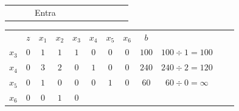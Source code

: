 \begin{frame}
{\begin{table}
\begin{tabular}{c c c c c c c c c c c c}
				& & & \scriptsize Entra \\
			\end{tabular}
		\end{table}	
	}	
	{
		\begin{table}
			\begin{tabular}{c c c c c c c c c c c c}
				& \cellcolor{blue!80} \color{white} $ \scriptstyle z$
				& \cellcolor{blue!80} \color{white} $ \scriptstyle x_1$ 
				& \cellcolor{blue!80} \color{white} $ \scriptstyle x_2$
				& \cellcolor{blue!80} \color{red} $ \scriptstyle x_3$
				& \cellcolor{blue!80} \color{red} $ \scriptstyle x_4$
				& \cellcolor{blue!80} \color{red} $ \scriptstyle x_5$
				& \cellcolor{blue!80} \color{red} $ \scriptstyle x_6$ 
				& \cellcolor{blue!80} \color{white} $ \scriptstyle b$ \\
				\cellcolor{blue!80} \color{red} $ \scriptstyle x_3$
				& \cellcolor{yellow!60}  $ \scriptstyle 0$
				& \cellcolor{yellow!60}  $ \scriptstyle 1$ 
				& \cellcolor{gray!60}  $ \scriptstyle 1$
				& \cellcolor{yellow!60}  $ \scriptstyle 1$
				& \cellcolor{yellow!60}  $ \scriptstyle 0$
				& \cellcolor{yellow!60}  $ \scriptstyle 0$
				& \cellcolor{yellow!60}  $ \scriptstyle 0$ 
				& \cellcolor{gray!60}  $ \scriptstyle 100$
				& $ \scriptstyle 100 \div 1 = 100$ \\ 
				\cellcolor{blue!80} \color{red} $ \scriptstyle x_4$
				& \cellcolor{yellow!60}  $ \scriptstyle 0$
				& \cellcolor{yellow!60}  $ \scriptstyle 3$ 
				& \cellcolor{gray!60}  $ \scriptstyle 2$
				& \cellcolor{yellow!60}  $ \scriptstyle 0$
				& \cellcolor{yellow!60}  $ \scriptstyle 1$
				& \cellcolor{yellow!60}  $ \scriptstyle 0$
				& \cellcolor{yellow!60}  $ \scriptstyle 0$ 
				& \cellcolor{gray!60}  $ \scriptstyle 240$ 
				& $ \scriptstyle 240 \div 2 = 120$ \\ 
				\cellcolor{blue!80} \color{red} $ \scriptstyle x_5$  
				& \cellcolor{yellow!60}  $ \scriptstyle 0$
				& \cellcolor{yellow!60}  $ \scriptstyle 1$ 
				& \cellcolor{gray!60}  $ \scriptstyle 0$
				& \cellcolor{yellow!60}  $ \scriptstyle 0$
				& \cellcolor{yellow!60}  $ \scriptstyle 0$
				& \cellcolor{yellow!60}  $ \scriptstyle 1$
				& \cellcolor{yellow!60}  $ \scriptstyle 0$ 
				& \cellcolor{gray!60}  $ \scriptstyle 60$ 
				& $ \scriptstyle 60 \div 0 = \infty$ \\
				\cellcolor{blue!80} \color{red} $ \scriptstyle x_6$
				& \cellcolor{gray!60}  $ \scriptstyle 0$
				& \cellcolor{gray!60}  $ \scriptstyle 0$ 
				& \cellcolor{red!60}  $ \scriptstyle 1$
				& \cellcolor{gray!60}  $ \scriptstyle 0$

\end{tabular}
\end{table}}
\end{frame}
